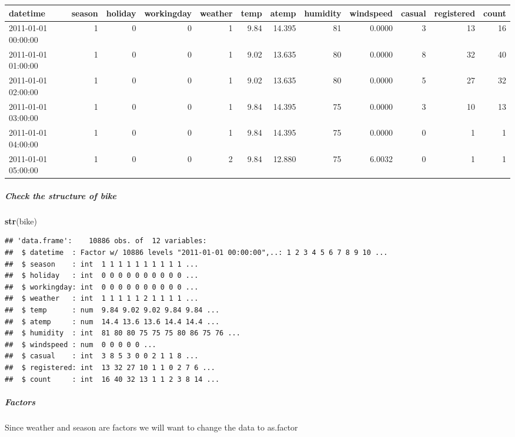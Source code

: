 \documentclass[]{article}
\newenvironment{Shaded}{\begin{snugshade}}{\end{snugshade}}
\newcommand{\KeywordTok}[1]{\textcolor[rgb]{0.13,0.29,0.53}{\textbf{#1}}}
\newcommand{\NormalTok}[1]{#1}
\let\oldsubparagraph\subparagraph
\renewcommand{\subparagraph}[1]{\oldsubparagraph{#1}\mbox{}}
\begin{document}
\begin{table}[H]
\centering
\begin{tabular}{l|r|r|r|r|r|r|r|r|r|r|r}
\hline
datetime & season & holiday & workingday & weather & temp & atemp & humidity & windspeed & casual & registered & count\\
\hline
2011-01-01 00:00:00 & 1 & 0 & 0 & 1 & 9.84 & 14.395 & 81 & 0.0000 & 3 & 13 & 16\\
\hline
2011-01-01 01:00:00 & 1 & 0 & 0 & 1 & 9.02 & 13.635 & 80 & 0.0000 & 8 & 32 & 40\\
\hline
2011-01-01 02:00:00 & 1 & 0 & 0 & 1 & 9.02 & 13.635 & 80 & 0.0000 & 5 & 27 & 32\\
\hline
2011-01-01 03:00:00 & 1 & 0 & 0 & 1 & 9.84 & 14.395 & 75 & 0.0000 & 3 & 10 & 13\\
\hline
2011-01-01 04:00:00 & 1 & 0 & 0 & 1 & 9.84 & 14.395 & 75 & 0.0000 & 0 & 1 & 1\\
\hline
2011-01-01 05:00:00 & 1 & 0 & 0 & 2 & 9.84 & 12.880 & 75 & 6.0032 & 0 & 1 & 1\\
\hline
\end{tabular}
\end{table}

\subparagraph{Check the structure of
bike}\label{check-the-structure-of-bike}

\begin{Shaded}
\begin{Highlighting}[]
\KeywordTok{str}\NormalTok{(bike)}
\end{Highlighting}
\end{Shaded}

\begin{verbatim}
## 'data.frame':    10886 obs. of  12 variables:
##  $ datetime  : Factor w/ 10886 levels "2011-01-01 00:00:00",..: 1 2 3 4 5 6 7 8 9 10 ...
##  $ season    : int  1 1 1 1 1 1 1 1 1 1 ...
##  $ holiday   : int  0 0 0 0 0 0 0 0 0 0 ...
##  $ workingday: int  0 0 0 0 0 0 0 0 0 0 ...
##  $ weather   : int  1 1 1 1 1 2 1 1 1 1 ...
##  $ temp      : num  9.84 9.02 9.02 9.84 9.84 ...
##  $ atemp     : num  14.4 13.6 13.6 14.4 14.4 ...
##  $ humidity  : int  81 80 80 75 75 75 80 86 75 76 ...
##  $ windspeed : num  0 0 0 0 0 ...
##  $ casual    : int  3 8 5 3 0 0 2 1 1 8 ...
##  $ registered: int  13 32 27 10 1 1 0 2 7 6 ...
##  $ count     : int  16 40 32 13 1 1 2 3 8 14 ...
\end{verbatim}

\subparagraph{Factors}\label{factors}

Since weather and season are factors we will want to change the data to
as.factor
\end{document}
